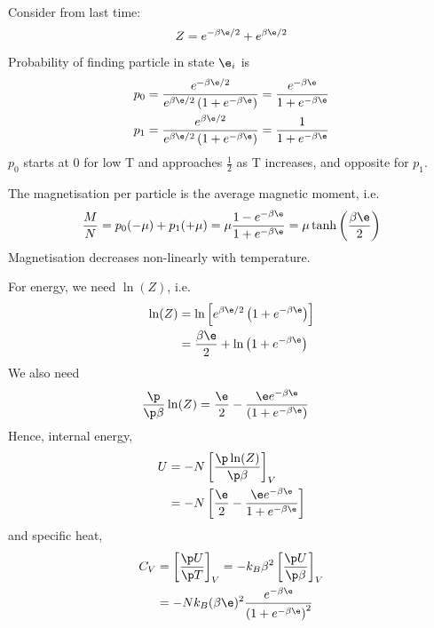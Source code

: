 \documentclass[a4paper, 11pt, normalem]{report}
\begin{document}
\chapter{}
Consider from last time:
\begin{equation}
    Z = e^{-\beta\e/2} + e^{\beta\e/2}
\end{equation}
Probability of finding particle in state $\e_i$ is 
\begin{align}
    p_0 &= \frac{e^{-\beta\e/2}}{e^{\beta\e/2}\left(1 + e^{-\beta\e}\right)} = \frac{e^{-\beta\e}}{1 + e^{-\beta\e}} \\
    p_1 &= \frac{e^{\beta\e/2}}{e^{\beta\e/2}\left(1 + e^{-\beta\e}\right)} = \frac{1}{1 + e^{-\beta\e}}
\end{align}
$p_0$ starts at 0 for low T and approaches $\frac{1}{2}$ as T increases, and opposite for $p_1$.

The magnetisation per particle is the average magnetic moment, i.e.
\begin{equation}
    \frac{M}{N} = p_0(-\mu) + p_1(+\mu) = \mu \frac{1 - e^{-\beta\e}}{1 + e^{-\beta\e}} = \mu\tanh\left(\frac{\beta\e}{2}\right)
\end{equation}
Magnetisation decreases non-linearly with temperature.

For energy, we need $\ln(Z)$, i.e.
\begin{align}
    \ln(Z) &= \ln\left[e^{\beta\e/2}\left(1 + e^{-\beta\e}\right)\right] \\
           &= \frac{\beta\e}{2} + \ln\left(1 + e^{-\beta\e}\right)
\end{align}
We also need
\begin{align}
    \frac{\p}{\p \beta}\ln(Z) &= \frac{\e}{2} - \frac{\e e^{-\beta\e}}{\left(1 + e^{-\beta\e}\right)}
\end{align}
Hence, internal energy,
\begin{align}
    U &= -N\left[\frac{\p \ln(Z)}{\p \beta}\right]_V  \\
      &= -N \left[\frac{\e}{2} - \frac{\e e^{-\beta\e}}{1 + e^{-\beta\e}}\right]
\end{align}
and specific heat, 
\begin{align}
    C_V &= \left[\frac{\p U}{\p T}\right]_V = -k_B\beta^2\left[\frac{\p U}{\p \beta}\right]_V \\
        &= -Nk_B (\beta\e)^2 \frac{e^{-\beta\e}}{\left(1 + e^{-\beta\e}\right)^2}
\end{align}
\end{document}
